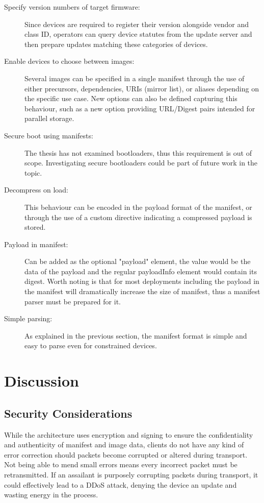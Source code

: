 \documentclass[0-thesis.tex]{subfiles}
\begin{document}
\begin{description}
    \item[Specify version numbers of target firmware:]
        Since devices are required to register their version alongside vendor and class
        ID, operators can query device statutes from the update server and then prepare
        updates matching these categories of devices.

    \item[Enable devices to choose between images:]
        Several images can be specified in a single manifest through the use of either
        precursors, dependencies, URIs (mirror list), or aliases depending on the specific
        use case. New options can also be defined capturing this behaviour, such as a new
        option providing URL/Digest pairs intended for parallel storage.

    \item[Secure boot using manifests:]
        The thesis has not examined bootloaders, thus this requirement is out of scope.
        Investigating secure bootloaders could be part of future work in the topic.

    \item[Decompress on load:]
        This behaviour can be encoded in the payload format of the manifest, or through
        the use of a custom directive indicating a compressed payload is stored.

    \item[Payload in manifest:]
        Can be added as the optional "payload" element, the value would be the data of the
        payload and the regular payloadInfo element would contain its digest. Worth noting
        is that for most deployments including the payload in the manifest will
        dramatically increase the size of manifest, thus a manifest parser must be
        prepared for it.

    \item[Simple parsing:]
        As explained in the previous section, the manifest format is simple and easy to
        parse even for constrained devices.
\end{description}

\section{Discussion}
\label{sec:discussion}


\subsection{Security Considerations}
\label{ssec:security-considerations}
While the architecture uses encryption and signing to ensure the confidentiality and
authenticity of manifest and image data, clients do not have any kind of error correction
should packets become corrupted or altered during transport. Not being able to mend small
errors means every incorrect packet must be retransmitted. If an assailant is purposely
corrupting packets during transport, it could effectively lead to a DDoS attack, denying
the device an update and wasting energy in the process.
\end{document}
